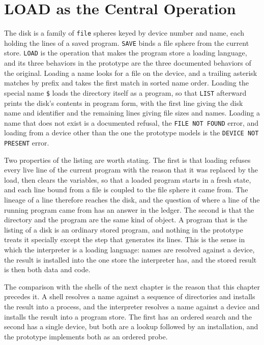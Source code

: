 
\section{LOAD as the Central Operation}

The disk is a family of \texttt{file} spheres keyed by device number and name, each holding the lines of a saved program. \texttt{SAVE} binds a file sphere from the current store. \texttt{LOAD} is the operation that makes the program store a loading language, and its three behaviors in the prototype are the three documented behaviors of the original. Loading a name looks for a file on the device, and a trailing asterisk matches by prefix and takes the first match in sorted name order. Loading the special name \texttt{\$} loads the directory itself as a program, so that \texttt{LIST} afterward prints the disk's contents in program form, with the first line giving the disk name and identifier and the remaining lines giving file sizes and names. Loading a name that does not exist is a documented refusal, the \texttt{FILE NOT FOUND} error, and loading from a device other than the one the prototype models is the \texttt{DEVICE NOT PRESENT} error.


Two properties of the listing are worth stating. The first is that loading refuses every live line of the current program with the reason that it was replaced by the load, then clears the variables, so that a loaded program starts in a fresh state, and each line bound from a file is coupled to the file sphere it came from. The lineage of a line therefore reaches the disk, and the question of where a line of the running program came from has an answer in the ledger. The second is that the directory and the program are the same kind of object. A program that is the listing of a disk is an ordinary stored program, and nothing in the prototype treats it specially except the step that generates its lines. This is the sense in which the interpreter is a loading language: names are resolved against a device, the result is installed into the one store the interpreter has, and the stored result is then both data and code.

The comparison with the shells of the next chapter is the reason that this chapter precedes it. A shell resolves a name against a sequence of directories and installs the result into a process, and the interpreter resolves a name against a device and installs the result into a program store. The first has an ordered search and the second has a single device, but both are a lookup followed by an installation, and the prototype implements both as an ordered probe.

